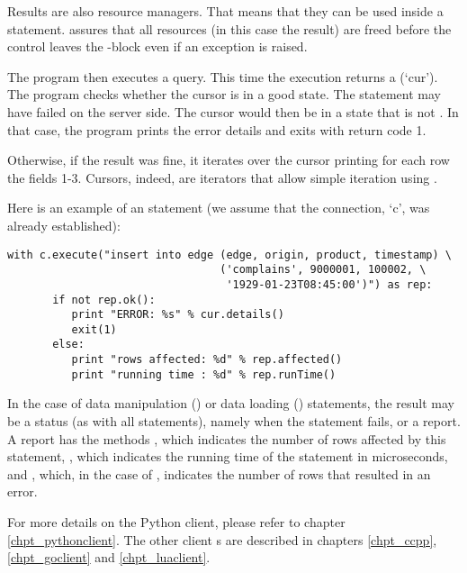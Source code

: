 Results are also resource managers. That means
that they can be used inside a  statement.
 assures that all resources (in this case
the result) are freed before the control leaves
the -block even if an exception is raised.

The program then executes a query.
This time the execution returns a  (`cur').
The program checks whether the cursor is
in a good state. The statement may have
failed on the server side. The cursor would
then be in a state that is not .
In that case, the program prints the error details
and exits with return code 1.

Otherwise, if the result was fine,
it iterates over the cursor
printing for each row the fields 1-3.
Cursors, indeed, are iterators
that allow simple iteration using .

Here is an example of an  statement
(we assume that the connection, `c', was already established):

\begin{python}
\begin{lstlisting}
with c.execute("insert into edge (edge, origin, product, timestamp) \
                                 ('complains', 9000001, 100002, \
                                  '1929-01-23T08:45:00')") as rep:
       if not rep.ok():
          print "ERROR: %s" % cur.details()
          exit(1)
       else:
          print "rows affected: %d" % rep.affected()
          print "running time : %d" % rep.runTime()
\end{lstlisting}
\end{python}

In the case of data manipulation ()
or data loading () statements,
the result may be a status (as with all statements),
namely when the statement fails,
or a report.
A report has the methods ,
which indicates the number of rows affected by this statement,
\term{runTime()},
which indicates the running time of the statement in microseconds,
and ,
which, in the case of \term{load},
indicates the number of rows that resulted in an error.

For more details on the Python client,
please refer to chapter \ref{chpt_pythonclient}.
The other client \acronym{api}s are described
in chapters \ref{chpt_ccpp}, \ref{chpt_goclient} and
\ref{chpt_luaclient}.

